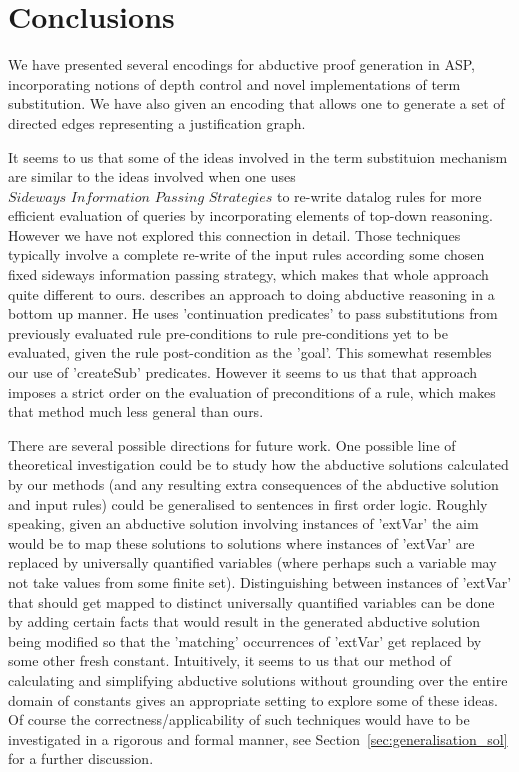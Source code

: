 \section{ Conclusions}\label{sec:conclusion}
We have presented several encodings for abductive proof generation in ASP,
incorporating notions of depth control and  novel implementations of term
substitution. We have also given an encoding that allows one to generate a set
of directed edges representing a justification graph.

It seems to us that some of the ideas involved in the term substituion
mechanism are similar to the ideas involved when one uses $\textit{Sideways
  Information Passing Strategies}$ \cite{beeri91} to re-write datalog rules
for more efficient evaluation of queries by incorporating elements of top-down
reasoning. However we have not explored this connection in detail. Those techniques 
typically involve a complete re-write of the input
rules according some chosen fixed sideways information passing strategy, which
makes that whole approach quite different to ours. \cite{DBLP:journals/jar/Stickel94} describes an approach 
to doing abductive reasoning in a bottom up manner. He uses 'continuation predicates' to pass substitutions from previously evaluated rule pre-conditions to rule pre-conditions yet to be evaluated, given the rule post-condition as the 'goal'. This somewhat resembles our use of 'createSub' predicates. However it seems to us that
that approach 
imposes a strict order on the evaluation of preconditions of a rule, which makes 
that method much less general than ours. 

There are several possible directions for future work. One possible line of theoretical investigation 
could be to study how the abductive solutions calculated by our methods (and any resulting extra
consequences of the abductive solution and input rules) could be generalised to 
sentences in first order logic. Roughly speaking, given an abductive solution involving
instances of 'extVar' the aim would be to map these solutions to solutions where instances
of 'extVar' are replaced by universally quantified variables (where perhaps such a variable may
not take values from some finite set).  Distinguishing between instances of 'extVar' that should 
get mapped to distinct universally quantified variables can be done by adding certain facts 
that would result in the generated abductive solution being modified so that the 'matching' 
occurrences of 'extVar' get replaced by some other fresh constant. Intuitively, it seems to 
us that our method of calculating and simplifying abductive solutions without grounding over
the entire domain of constants gives an appropriate 
setting to explore some of these ideas. Of course the correctness/applicability of such techniques 
would have to be investigated in a rigorous and formal manner, see
Section~\ref{sec:generalisation_sol} for a further discussion.


